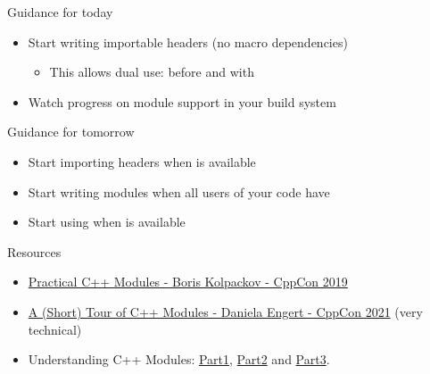 \begin{frame}[fragile]
    \begin{exampleblock}{Guidance for today}
      \begin{itemize}
        \item Start writing importable headers (no macro dependencies)
        \begin{itemize}
          \item This allows dual use:  before  and  with 
        \end{itemize}
        \item Watch progress on module support in your build system
      \end{itemize}
    \end{exampleblock}
    \begin{exampleblock}{Guidance for tomorrow}
      \begin{itemize}
        \item Start importing headers when  is available
        \item Start writing modules when all users of your code have 
        \item Start using  when  is available
      \end{itemize}
    \end{exampleblock}
\end{frame}

\begin{frame}[fragile]
    \begin{block}{Resources}
      \begin{itemize}
      \item \href{https://www.youtube.com/watch?v=szHV6RdQdg8}{Practical C++ Modules - Boris Kolpackov - CppCon 2019}
      \item \href{https://www.youtube.com/watch?v=nP8QcvPpGeM}{A (Short) Tour of C++ Modules - Daniela Engert - CppCon 2021} (very technical)
      \item Understanding C++ Modules: \href{https://vector-of-bool.github.io/2019/03/10/modules-1.html}{Part1}, \href{https://vector-of-bool.github.io/2019/03/31/modules-2.html}{Part2} and \href{https://vector-of-bool.github.io/2019/10/07/modules-3.html}{Part3}.
      \end{itemize}
    \end{block}
\end{frame}

